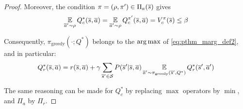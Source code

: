 \begin{proof}
Moreover, the condition $\pi=(\rho, \pi')\in\Pi_a(\overline{s})$ gives
\begin{equation*}
   \operatorname*{\mathbb{E}}\limits_{\overline{a}'\sim\rho} Q_c^{*}(\overline{s}, \overline{a}) = \operatorname*{\mathbb{E}}\limits_{\overline{a}'\sim\rho} Q_c^{\pi'}(\overline{s}, \overline{a}) = V_c^{\pi}(\overline{s}) \leq \beta
\end{equation*}

Consequently, $\pi_\text{greedy}(\cdot; Q^*)$ belongs to the $\operatorname*{arg\,max}$ of \eqref{eq:pthm_marg_def2}, and in particular:
\begin{equation*}
     Q_r^*(\overline{s}, \overline{a}) = r(\overline{s}, \overline{a}) + \gamma \sum_{\overline{s}'\in\mathcal{S}}  P(\overline{s}' | \overline{s}, \overline{a}) \operatorname*{\mathbb{E}}\limits_{\overline{a}'\sim\pi_\text{greedy}(\overline{s}', Q^*)} Q_r^*(\overline{s}', \overline{a}')
\end{equation*}

The same reasoning can be made for $Q_c^*$ by replacing $\max$ operators by $\min$, and $\Pi_a$ by $\Pi_r$.
\end{proof}











